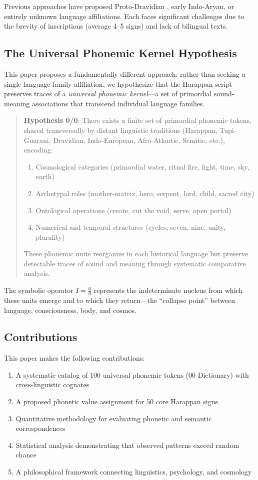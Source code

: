 \documentclass[12pt,a4paper]{article}
\begin{document}
Previous approaches have proposed Proto-Dravidian \citep{parpola1994}, early Indo-Aryan, or entirely unknown language affiliations. Each faces significant challenges due to the brevity of inscriptions (average 4--5 signs) and lack of bilingual texts.

\subsection{The Universal Phonemic Kernel Hypothesis}

This paper proposes a fundamentally different approach: rather than seeking a single language family affiliation, we hypothesize that the Harappan script preserves traces of a \textit{universal phonemic kernel}---a set of primordial sound-meaning associations that transcend individual language families.

\begin{quote}
\textbf{Hypothesis 0/0}: There exists a finite set of primordial phonemic tokens, shared transversally by distant linguistic traditions (Harappan, Tupi-Guarani, Dravidian, Indo-European, Afro-Atlantic, Semitic, etc.), encoding:
\begin{enumerate}
    \item Cosmological categories (primordial water, ritual fire, light, time, sky, earth)
    \item Archetypal roles (mother-matrix, hero, serpent, lord, child, sacred city)
    \item Ontological operations (create, cut the void, serve, open portal)
    \item Numerical and temporal structures (cycles, seven, nine, unity, plurality)
\end{enumerate}
These phonemic units reorganize in each historical language but preserve detectable traces of sound and meaning through systematic comparative analysis.
\end{quote}

The symbolic operator $I = \frac{0}{0}$ represents the indeterminate nucleus from which these units emerge and to which they return---the ``collapse point'' between language, consciousness, body, and cosmos.

\subsection{Contributions}

This paper makes the following contributions:

\begin{enumerate}
    \item A systematic catalog of 100 universal phonemic tokens (00 Dictionary) with cross-linguistic cognates
    \item A proposed phonetic value assignment for 50 core Harappan signs
    \item Quantitative methodology for evaluating phonetic and semantic correspondences
    \item Statistical analysis demonstrating that observed patterns exceed random chance
    \item A philosophical framework connecting linguistics, psychology, and cosmology
\end{enumerate}
\end{document}
